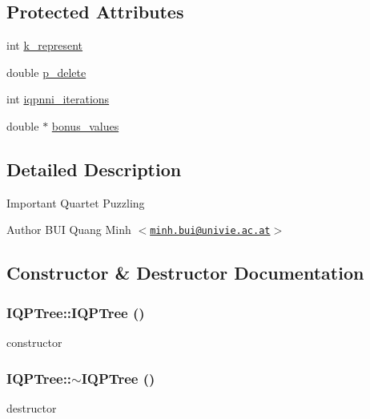 \subsection*{Protected Attributes}
\begin{DoxyCompactItemize}
\item 
int \hyperlink{classIQPTree_a3ee6ae6c50af3a0bf669e7f550a5d670}{k\_\-represent}
\item 
double \hyperlink{classIQPTree_a74e9e5f5ce563559d2788818f0584459}{p\_\-delete}
\item 
int \hyperlink{classIQPTree_aee1659fac7169d2adca3e9b2609b638e}{iqpnni\_\-iterations}
\item 
double $\ast$ \hyperlink{classIQPTree_ae9f6d55e262018addddb737f16ca1bd5}{bonus\_\-values}
\end{DoxyCompactItemize}


\subsection{Detailed Description}
Important Quartet Puzzling

\begin{DoxyAuthor}{Author}
BUI Quang Minh $<$\href{mailto:minh.bui@univie.ac.at}{\tt minh.bui@univie.ac.at}$>$ 
\end{DoxyAuthor}


\subsection{Constructor \& Destructor Documentation}
\hypertarget{classIQPTree_aa29641a82fd24a3023b527496b1d1903}{
\subsubsection[{IQPTree}]{\setlength{\rightskip}{0pt plus 5cm}IQPTree::IQPTree ()}}
\label{classIQPTree_aa29641a82fd24a3023b527496b1d1903}
constructor \hypertarget{classIQPTree_a35619d9f009df68327f7639ecded27f8}{
\subsubsection[{$\sim$IQPTree}]{\setlength{\rightskip}{0pt plus 5cm}IQPTree::$\sim$IQPTree ()}}
\label{classIQPTree_a35619d9f009df68327f7639ecded27f8}
destructor 


